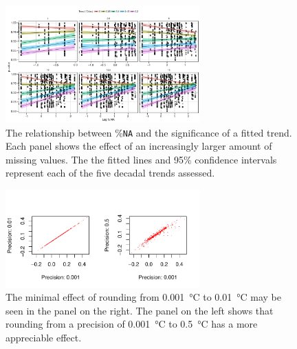 \documentclass[]{ametsoc}
\begin{document}
\begin{figure}
\centering \includegraphics[width=7.5cm]{figure06}
\caption[\small The relationship between \%\texttt{NA} and the significance of a fitted trend]{The relationship between \%\texttt{NA} and the significance of a fitted trend. Each panel shows the effect of an increasingly larger amount of missing values. The the fitted lines and 95\% confidence intervals represent each of the five decadal trends assessed. }
\label{figure06}
\end{figure}

\begin{figure}
\centering \includegraphics[width=7.5cm]{figure07}
\caption[\small The minimal effect of rounding from]{The minimal effect of rounding from \SI{0.001}{\degreeCelsius} to \SI{0.01}{\degreeCelsius} may be seen in the panel on the right. The panel on the left shows that rounding from a precision of \SI{0.001}{\degreeCelsius} to \SI{0.5}{\degreeCelsius} has a more appreciable effect.}
\label{figure07}
\end{figure}
\end{document}
